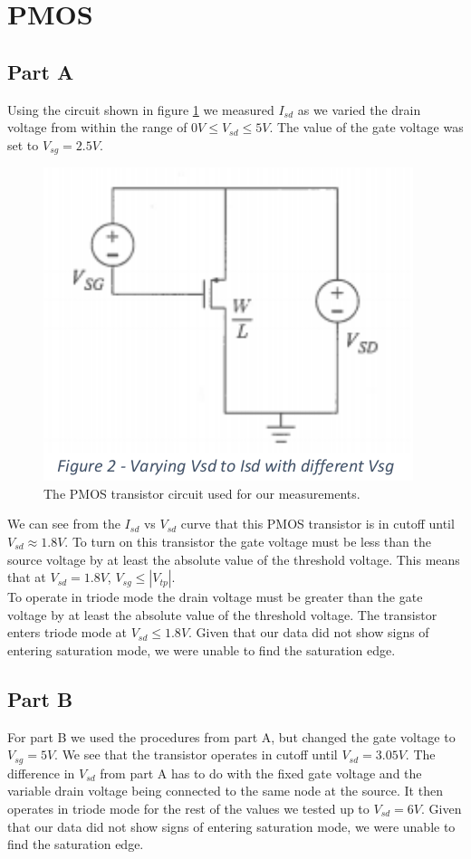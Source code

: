 \section{PMOS}
\subsection{Part A}
Using the circuit shown in figure \ref{fig:pmos_circuit} we measured $I_{sd}$ as we varied the drain voltage from within the range of $0 V \le V_{sd} \le 5 V$. 
The value of the gate voltage was set to $V_{sg} = 2.5V$. 
\\

\FloatBarrier

\begin{figure}[h!]
	\centering
	\includegraphics[scale=0.75]{../images/pmos_circuit}
	\caption{The PMOS transistor circuit used for our measurements.}
	\label{fig:pmos_circuit}
\end{figure}

\FloatBarrier
We can see from the $I_{sd}$ vs $V_{sd}$ curve that this PMOS transistor is in cutoff until $V_{sd} \approx 1.8 V$. 
To turn on this transistor the gate voltage must be less than the source voltage by at least the absolute value of the threshold voltage. 
This means that at $V_{sd} = 1.8 V$, $V_{sg} \le |V_{tp}|$.
\\
To operate in triode mode the drain voltage must be greater than the gate voltage by at least the absolute value of the threshold voltage.
The transistor enters triode mode at $ V_{sd} \le 1.8V$.
Given that our data did not show signs of entering saturation mode, we were unable to find the saturation edge.
\subsection{Part B}
For part B we used the procedures from part A, but changed the gate voltage to $V_{sg} = 5 V$. 
We see that the transistor operates in cutoff until $V_{sd} = 3.05 V$.
The difference in $V_{sd}$ from part A has to do with the fixed gate voltage and the variable drain voltage being connected to the same node at the source.
It then operates in triode mode for the rest of the values we tested up to $V_{sd}=6V$.
Given that our data did not show signs of entering saturation mode, we were unable to find the saturation edge.
